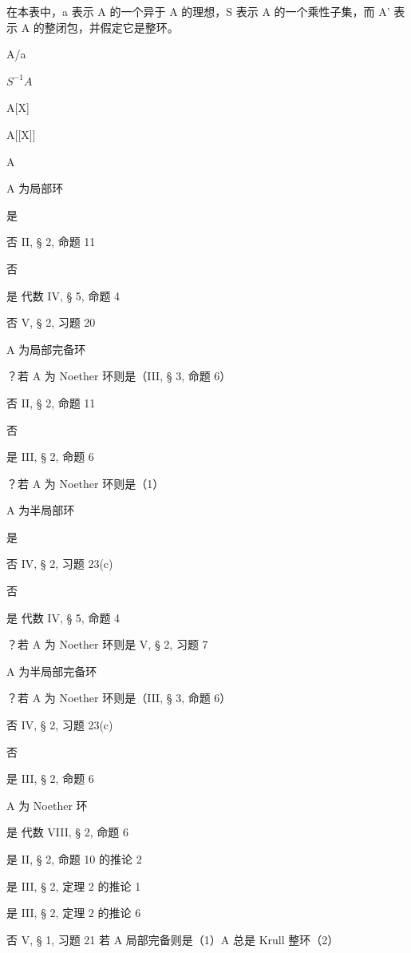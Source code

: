 
在本表中，a 表示 A 的一个异于 A 的理想，S 表示 A 的一个乘性子集，而 A' 表示 A 的整闭包，并假定它是整环。

A/a

\(S^{-1}A\)

A{[}X{]}

A{[}{[}X{]}{]}

A\textquotesingle{}

A 为局部环

是

否 II, § 2, 命题 11

否

是 代数 IV, § 5, 命题 4

否 V, § 2, 习题 20

A 为局部完备环

？若 A 为 Noether 环则是（III, § 3, 命题 6）

否 II, § 2, 命题 11

否

是 III, § 2, 命题 6

？若 A 为 Noether 环则是（1）

A 为半局部环

是

否 IV, § 2, 习题 23(c)

否

是 代数 IV, § 5, 命题 4

？若 A 为 Noether 环则是 V, § 2, 习题 7

A 为半局部完备环

？若 A 为 Noether 环则是（III, § 3, 命题 6）

否 IV, § 2, 习题 23(c)

否

是 III, § 2, 命题 6

A 为 Noether 环

是 代数 VIII, § 2, 命题 6

是 II, § 2, 命题 10 的推论 2

是 III, § 2, 定理 2 的推论 1

是 III, § 2, 定理 2 的推论 6

否 V, § 1, 习题 21 若 A 局部完备则是（1）A\textquotesingle{} 总是 Krull 整环（2）

